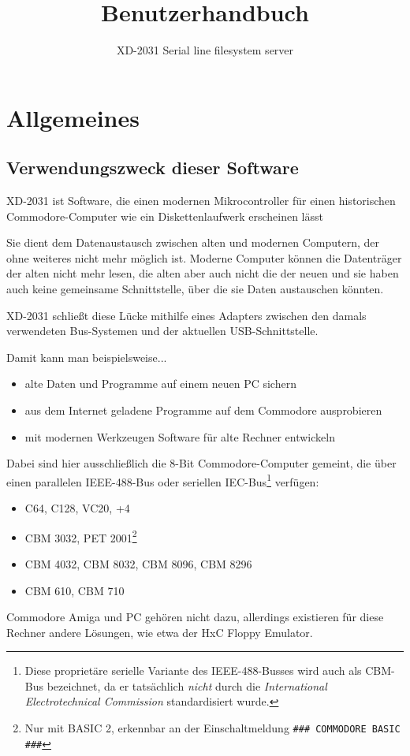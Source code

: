 \documentclass[10pt,a4paper]{scrartcl}		%
\begin{document}
\title{Benutzerhandbuch}
\subtitle{XD-2031 Serial line filesystem server}
\author{}
\maketitle\thispagestyle{empty}

\clearpage

\tableofcontents
\clearpage

\section{Allgemeines}

\subsection{Verwendungszweck dieser Software}
XD-2031 ist Software, die einen modernen Mikrocontroller für einen
historischen Commodore-Computer wie ein Diskettenlaufwerk erscheinen lässt

Sie dient dem Datenaustausch zwischen alten und modernen Computern, der
ohne weiteres nicht mehr möglich ist. 
Moderne Computer können die Datenträger der alten nicht mehr lesen,
die alten aber auch nicht die der neuen und sie haben auch keine gemeinsame 
Schnittstelle, über die sie Daten austauschen könnten.

XD-2031 schließt diese Lücke mithilfe eines Adapters zwischen den
damals verwendeten Bus-Systemen und der aktuellen USB-Schnittstelle.

Damit kann man beispielsweise...
\begin{itemize}
\item alte Daten und Programme auf einem neuen PC sichern
\item aus dem Internet geladene Programme auf dem Commodore ausprobieren
\item mit modernen Werkzeugen Software für alte Rechner entwickeln
\end{itemize}

Dabei sind hier ausschließlich die 8-Bit Commodore-Computer gemeint, die 
über einen parallelen IEEE-488-Bus  oder seriellen
	  IEC-Bus\footnote
	{Diese proprietäre serielle Variante des IEEE-488-Busses wird
	auch als CBM-Bus bezeichnet, da er tatsächlich \textit{nicht} durch die
	\textit{International Electrotechnical Commission} standardisiert
	wurde.}
verfügen:
\begin{itemize}
\item C64, C128, VC20, +4
\item CBM 3032, 
PET 2001\footnote{
	Nur mit BASIC 2, erkennbar an der Einschaltmeldung 
	\texttt{\#\#\# COMMODORE BASIC \#\#\#}}
\item CBM 4032, CBM 8032, CBM 8096, CBM 8296 
\item CBM 610, CBM 710
\end{itemize}
Commodore Amiga und PC gehören nicht dazu, allerdings existieren 
für diese Rechner andere Lösungen, wie etwa der HxC Floppy Emulator.
\end{document}
